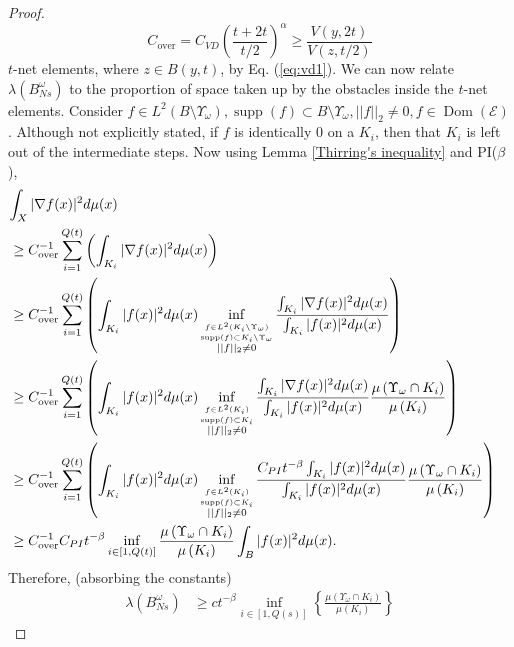 \documentclass[letterpaper,oneside,english]{amsart}
\begin{document}
\begin{proof}
\begin{equation}
C_{\mathrm{over}}=C_{VD}\left(\frac{t+2t}{t/2}\right)^{\alpha}\ge \frac{V(y,2t)}{V(z,t/2)}
\end{equation}
$t$-net elements, where $z\in B(y,t)$, by Eq. (\ref{eq:vd1}).
We can now relate $\lambda\left(B_{Ns}^{\omega}\right)$ to the proportion of space taken up by the obstacles inside the $t$-net elements.
Consider $f\in L^2(B \setminus {\Upsilon_{\omega}}), {\operatorname{supp}}(f) \subset B \setminus {\Upsilon_{\omega}}, ||f||_2 \ne 0, f\in{\operatorname{Dom}}({\mathcal{E}})$.  Although not explicitly stated, if $f$ is identically 0 on a $K_i$, then that $K_i$ is left out of the intermediate steps.
 Now using Lemma \ref{Thirring's inequality} and PI($\beta$),
\begin{align*}
\lefteqn{\int_X |{\nabla} f(x)|^2 d\mu(x)}\\
 & \ge C_{\mathrm{over}}^{-1}\sum_{i=1}^{Q(t)}\left(
\int_{K_i} |{\nabla} f(x)|^2 d\mu(x)
\right)\\
& \ge C_{\mathrm{over}}^{-1}\sum_{i=1}^{Q(t)}\left( 
\int_{K_i} |f(x) |^2 d\mu(x) 
\inf_{\stackrel{f\in L^2(K_i \setminus {\Upsilon_{\omega}})}{\stackrel{ {\operatorname{supp}}(f) \subset K_i \setminus {\Upsilon_{\omega}}}{||f||_2 \ne 0}}}
\frac{\int_{K_i} |{\nabla} f(x)|^2 d\mu(x)}{\int_{K_i} |f(x)|^2 d\mu(x)}
\right)
\\
& \ge C_{\mathrm{over}}^{-1}\sum_{i=1}^{Q(t)}\left( 
\int_{K_i} |f(x)|^2 d\mu(x) 
\inf_{\stackrel{f\in L^2(K_i)}{\stackrel{ {\operatorname{supp}}(f) \subset K_i}{ ||f||_2 \ne 0}}} 
\frac{ \int_{K_i} |{\nabla} f(x)|^2 d\mu(x)}{\int_{K_i} |f(x)|^2 d\mu(x)} 
\frac{\mu\left({\Upsilon_{\omega}}\cap K_{i} \right)}{\mu\left(K_{i}\right)}
\right)
\\
& \ge C_{\mathrm{over}}^{-1}\sum_{i=1}^{Q(t)}\left( 
\int_{K_i} |f(x)|^2 d\mu(x) 
\inf_{\stackrel{f\in L^2(K_i)}{\stackrel{ {\operatorname{supp}}(f) \subset K_i}{ ||f||_2 \ne 0}}}
\frac{C_{PI}t^{-\beta} \int_{K_i} |f(x)|^2 d\mu(x)}{\int_{K_i} |f(x)|^2 d\mu(x)} 
\frac{\mu\left({\Upsilon_{\omega}}\cap K_{i}\right)}{\mu\left(K_{i}\right)}
\right)
\\
& \ge C_{\mathrm{over}}^{-1} C_{PI}t^{-\beta} 
\inf_{i \in [1, Q(t)]}
\frac{\mu\left( {\Upsilon_{\omega}}\cap K_{i} \right)}{\mu\left(K_{i}\right)}
\int_{B} |f(x)|^2 d\mu(x) 
.
\end{align*}
Therefore, (absorbing the constants)
\begin{align*}
\lambda\left(B_{Ns}^{\omega}\right) & \ge ct^{-\beta}\inf_{i\in[1,Q(s)]}\left\{ \frac{\mu\left( {\Upsilon_{\omega}}\cap K_{i} \right)}{\mu\left(K_{i}\right)}\right\} \end{align*}

\end{proof}
\end{document}
